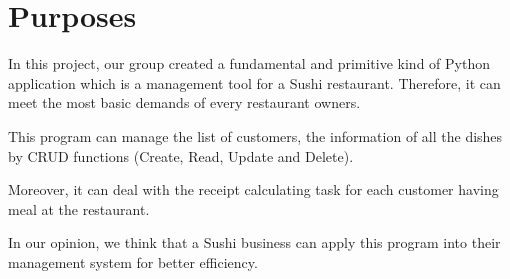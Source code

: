 \newpage
\section{Purposes}
\hspace{0.7cm}In this project, our group created a fundamental and primitive kind of Python application which is a management tool for a Sushi restaurant. Therefore, it can meet the most basic demands of every restaurant owners.

\vspace{0.7cm}
This program can manage the list of customers, the information of all the dishes by CRUD functions (Create, Read, Update and Delete). 

\vspace{0.7cm}
Moreover, it can deal with the receipt calculating task for each customer having meal at the restaurant.

\vspace{0.7cm}
In our opinion, we think that a Sushi business can apply this program into their management system for better efficiency.